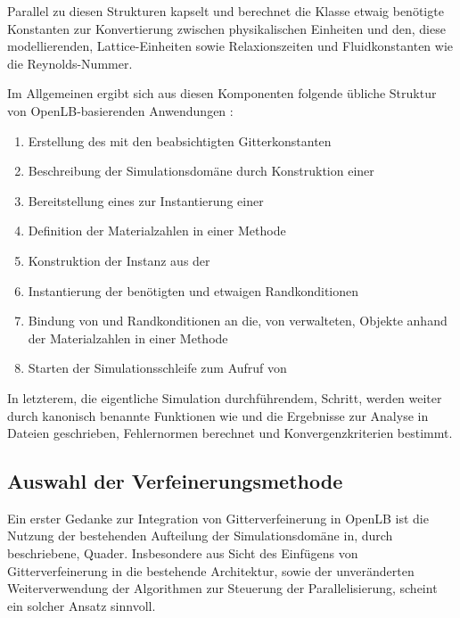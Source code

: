 Parallel zu diesen Strukturen kapselt und berechnet die  Klasse etwaig benötigte Konstanten zur Konvertierung zwischen physikalischen Einheiten und den, diese modellierenden, Lattice-Einheiten sowie Relaxionszeiten und Fluidkonstanten wie die Reynolds-Nummer.

\bigskip
Im Allgemeinen ergibt sich aus diesen Komponenten folgende übliche Struktur von OpenLB-basierenden Anwendungen \cite[Kap.~2.1]{olb12userguide}:
\begin{enumerate}
	\item Erstellung des  mit den beabsichtigten Gitterkonstanten
	\item Beschreibung der Simulationsdomäne durch Konstruktion einer 
	\item Bereitstellung eines  zur Instantierung einer 
	\item Definition der Materialzahlen in einer  Methode
	\item Konstruktion der  Instanz aus der 
	\item Instantierung der benötigten  und etwaigen Randkonditionen
	\item Bindung von  und Randkonditionen an die, von  verwalteten,  Objekte anhand der Materialzahlen in einer  Methode
	\item Starten der Simulationsschleife zum Aufruf von 
\end{enumerate}

In letzterem, die eigentliche Simulation durchführendem, Schritt, werden weiter durch kanonisch benannte Funktionen wie  und  die Ergebnisse zur Analyse in Dateien geschrieben, Fehlernormen berechnet und Konvergenzkriterien bestimmt.

\subsection{Auswahl der Verfeinerungsmethode}
\label{sec:olbRefinementChoice}

Ein erster Gedanke zur Integration von Gitterverfeinerung in OpenLB ist die Nutzung der bestehenden Aufteilung der Simulationsdomäne in, durch  beschriebene, Quader. Insbesondere aus Sicht des Einfügens von Gitterverfeinerung in die bestehende Architektur, sowie der unveränderten Weiterverwendung der  Algorithmen zur Steuerung der Parallelisierung, scheint ein solcher Ansatz sinnvoll.

